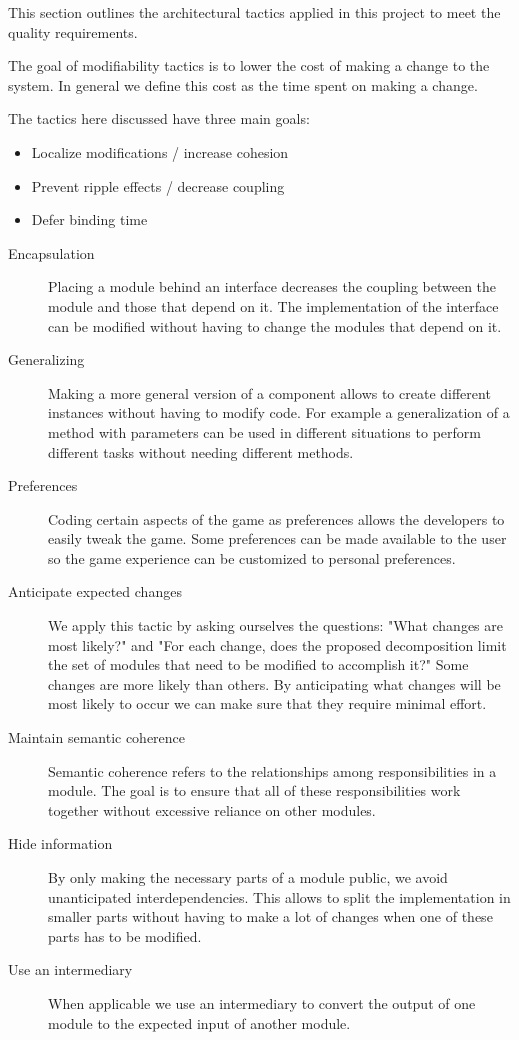 This section outlines the architectural tactics applied in this project to meet the quality requirements.

	The goal of modifiability tactics is to lower the cost of making a change to the system. In general we define this cost as the time spent on making a change.

	The tactics here discussed have three main goals:
	\begin{itemize}
		\item Localize modifications / increase cohesion
		\item Prevent ripple effects / decrease coupling
		\item Defer binding time
	\end{itemize}


	\begin{description}
		\item [Encapsulation]
			Placing a module behind an interface decreases the coupling between the module and those that depend on it. The implementation of the interface can be modified without having to change the modules that depend on it.
		\item [Generalizing]
			Making a more general version of a component allows to create different instances without having to modify code. For example a generalization of a method with parameters can be used in different situations to perform different tasks without needing different methods.
		\item [Preferences]
			Coding certain aspects of the game as preferences allows the developers to easily tweak the game. Some preferences can be made available to the user so the game experience can be customized to personal preferences.
		\item [Anticipate expected changes]
			We apply this tactic by asking ourselves the questions: "What changes are most likely?" and "For each change, does the proposed decomposition limit the set of modules that need to be modified to accomplish it?" Some changes are more likely than others. By anticipating what changes will be most likely to occur we can make sure that they require minimal effort.
		\item [Maintain semantic coherence]
			Semantic coherence refers to the relationships among responsibilities in a module. The goal is to ensure that all of these responsibilities work together without excessive reliance on other modules.
		\item [Hide information]
			By only making the necessary parts of a module public, we avoid unanticipated interdependencies. This allows to split the implementation in smaller parts without having to make a lot of changes when one of these parts has to be modified.
		\item [Use an intermediary]
		When applicable we use an intermediary to convert the output of one module to the expected input of another module.
	\end{description}


